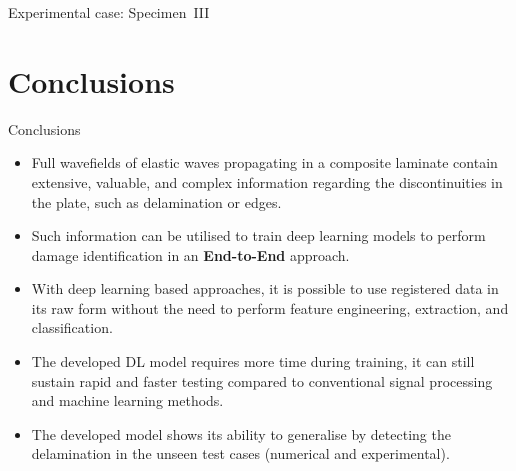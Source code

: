 \documentclass[10pt,aspectratio=169]{beamer} %
\begin{document}
\setcounter{subfigure}{0}
\begin{frame}{Experimental case: Specimen~III}
		\begin{figure}
		\centering
		\quad
		\quad
	\end{figure}
\end{frame}


\section{Conclusions}
\begin{frame}{Conclusions}
	\begin{itemize}
		\item Full wavefields of elastic waves propagating in a composite laminate contain extensive, valuable, and complex information regarding the discontinuities in the plate, such as delamination or edges.
		\item Such information can be utilised to train deep learning models
		to perform damage identification in an {\textbf{End-to-End}} approach.
		\item With deep learning based approaches, it is possible to use registered data in its raw form without the need to perform feature engineering, extraction, and classification.
		\item The developed DL model requires more time during training, it can still sustain rapid and faster testing compared to conventional signal processing and machine learning methods.
		\item The developed model shows its ability to generalise by detecting the delamination in the unseen test cases (numerical and experimental).
	\end{itemize}
\end{frame}
\end{document}
